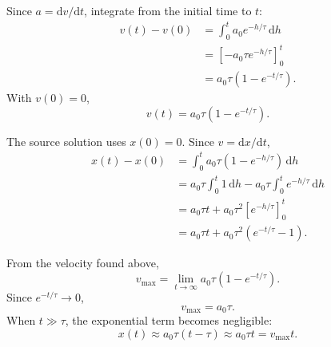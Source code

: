 \begin{solutionframe}
  \footnotesize
  Since $a=\mathrm{d}v/\mathrm{d}t$, integrate from the initial time to $t$:
  \begin{align*}
    v(t)-v(0)
      &=\int_0^t a_0e^{-h/\tau}\,\mathrm{d}h\\
      &=\left[-a_0\tau e^{-h/\tau}\right]_0^t\\
      &=a_0\tau\left(1-e^{-t/\tau}\right).
  \end{align*}
  With $v(0)=0$,
  \[
    v(t)=a_0\tau\left(1-e^{-t/\tau}\right).
  \]
  \centering
  \resizebox{0.47\textwidth}{!}{}
\end{solutionframe}

\begin{solutionframe}
  \footnotesize
  The source solution uses $x(0)=0$. Since $v=\mathrm{d}x/\mathrm{d}t$,
  \begin{align*}
    x(t)-x(0)
      &=\int_0^t a_0\tau\left(1-e^{-h/\tau}\right)\,\mathrm{d}h\\
      &=a_0\tau\int_0^t 1\,\mathrm{d}h
        -a_0\tau\int_0^t e^{-h/\tau}\,\mathrm{d}h\\
      &=a_0\tau t
        +a_0\tau^2\left[e^{-h/\tau}\right]_0^t\\
      &=a_0\tau t+a_0\tau^2\left(e^{-t/\tau}-1\right).
  \end{align*}
\end{solutionframe}

\begin{solutionframe}
  From the velocity found above,
  \[
    v_{\max}=\lim_{t\to\infty}
      a_0\tau\left(1-e^{-t/\tau}\right).
  \]
  Since $e^{-t/\tau}\to0$,
  \[
    v_{\max}=a_0\tau.
  \]
  When $t\gg\tau$, the exponential term becomes negligible:
  \[
    x(t)\approx a_0\tau(t-\tau)\approx a_0\tau t=v_{\max}t.
  \]
\end{solutionframe}

